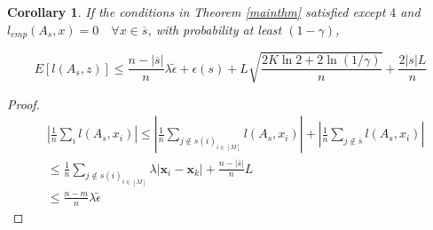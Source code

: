 \documentclass{article}
\newtheorem{cor}{Corollary}
\begin{document}
\begin{cor}
If the conditions in Theorem \ref{mainthm} satisfied except $4$ and $l_{emp}(A_s,x)=0\quad \forall x \in \overline{s}$, with probability at least $(1-\gamma)$,
\begin{small}
\[
E[l(A_s,z)] \leq \frac{n-|\overline{s}|}{n} \lambda \tilde{\epsilon} + \epsilon(s) + L \sqrt{\frac{2K\ln 2 + 2\ln (1/\gamma)}{n}} + \frac{2|s|L}{n}  
\]
\end{small}
\end{cor}
\begin{proof}
\[
\begin{aligned}
&\left|\frac{1}{n}\sum_i l(A_s,x_i) \right| \leq \left|\frac{1}{n}\sum_{j \notin {s(i)}_{i\in [M]}} l(A_s,x_i)  \right| +  \left|\frac{1}{n}\sum_{j \notin\overline{s}} l(A_s,x_i)  \right| \\
&\leq  \frac{1}{n}\sum_{j \notin {s(i)}_{i\in [M]}} \lambda  \left| \mathbf{x}_i - \mathbf{x}_k\right | +\frac{n-|\overline{s}|}{n}L \\
&\leq \frac{n-m}{n} \lambda \tilde{\epsilon}
\end{aligned}
\]
\end{proof}
\end{document}
